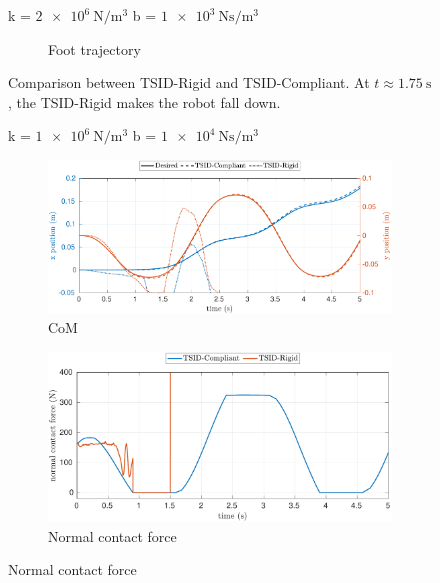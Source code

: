 \begin{figure}[t]
\begin{myframe}{k = $\SI{2e6}{\newton \per \meter^3}$  b = $\SI{1e3}{\newton \second \per \meter^3}$}
\begin{subfigure}[b]{0.49\textwidth}
        \caption{Foot trajectory}
        \label{fig:2e6_1e3_foot}
    \end{subfigure}
    \end{myframe}
    \caption{Comparison between TSID-Rigid and TSID-Compliant. At $t\approx \SI{1.75}{\second}$, the TSID-Rigid makes the robot fall down.}
\end{figure}

\begin{figure}[!t]
    \begin{myframe}{k = $\SI{1e6}{\newton \per \meter^3}$  b = $\SI{1e4}{\newton \second \per \meter^3}$}
    \centering
        \begin{subfigure}[b]{0.49\textwidth}
        \centering
        \includegraphics[height=0.151\textheight]{chapter_compliant_contact/figures/compliant_1e6_1e4_3_stiff_1e6_1e4_2_com.pdf}
        \caption{CoM}
        \label{fig:1e6_1e4_com}
    \end{subfigure}
    \hfill
    \begin{subfigure}[b]{0.49\textwidth}
        \centering
        \includegraphics[height=0.151\textheight]{chapter_compliant_contact/figures/compliant_1e6_1e4_3_stiff_1e6_1e4_2_force.pdf}
        \caption{Normal contact force}
        \label{fig:1e6_1e4_force}
    \end{subfigure}
    \hfill

\end{myframe}
\end{figure}
